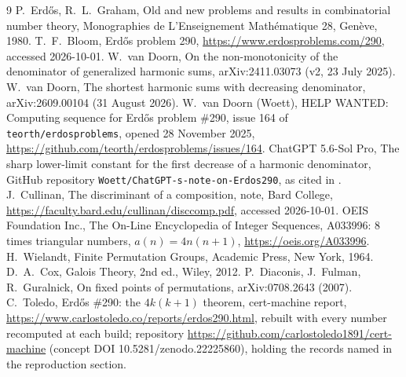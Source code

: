 \documentclass[11pt]{article}
\begin{document}
{\footnotesize\begin{thebibliography}{9}
 P.~Erd\H{o}s, R.~L.~Graham, Old and new problems and results in combinatorial number theory, Monographies de L'Enseignement Math\'ematique 28, Gen\`eve, 1980.
 T.~F.~Bloom, Erd\H{o}s problem 290, \url{https://www.erdosproblems.com/290}, accessed 2026-10-01.
 W.~van Doorn, On the non-monotonicity of the denominator of generalized harmonic sums, arXiv:2411.03073 (v2, 23 July 2025).
 W.~van Doorn, The shortest harmonic sums with decreasing denominator, arXiv:2609.00104 (31 August 2026).
 W.~van Doorn (Woett), HELP WANTED: Computing sequence for Erd\H{o}s problem \#290, issue 164 of \texttt{teorth/erdosproblems}, opened 28 November 2025, \url{https://github.com/teorth/erdosproblems/issues/164}.
 ChatGPT 5.6-Sol Pro, The sharp lower-limit constant for the first decrease of a harmonic denominator, GitHub repository \texttt{Woett/ChatGPT-s-note-on-Erdos290}, as cited in \cite{vD26}.
 J.~Cullinan, The discriminant of a composition, note, Bard College, \url{https://faculty.bard.edu/cullinan/disccomp.pdf}, accessed 2026-10-01.
 OEIS Foundation Inc., The On-Line Encyclopedia of Integer Sequences, A033996: $8$ times triangular numbers, $a(n)=4n(n+1)$, \url{https://oeis.org/A033996}.
 H.~Wielandt, Finite Permutation Groups, Academic Press, New York, 1964.
 D.~A.~Cox, Galois Theory, 2nd ed., Wiley, 2012.
 P.~Diaconis, J.~Fulman, R.~Guralnick, On fixed points of permutations, arXiv:0708.2643 (2007).
 C.~Toledo, Erd\H{o}s \#290: the $4k(k+1)$ theorem, cert-machine report, \url{https://www.carlostoledo.co/reports/erdos290.html}, rebuilt with every number recomputed at each build; repository \url{https://github.com/carlostoledo1891/cert-machine} (concept DOI 10.5281/zenodo.22225860), holding the records named in the reproduction section.
\end{thebibliography}}
\end{document}
